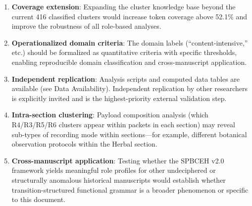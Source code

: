 \documentclass[11pt,a4paper,twocolumn]{article}
\begin{document}
\begin{enumerate}[leftmargin=*,itemsep=2pt]

    \item \textbf{Coverage extension}: Expanding the cluster knowledge base beyond the current 416 classified clusters would increase token coverage above 52.1\% and improve the robustness of all role-based analyses.

    \item \textbf{Operationalized domain criteria}: The domain labels (``content-intensive,'' etc.) should be formalized as quantitative criteria with specific thresholds, enabling reproducible domain classification and cross-manuscript application.

    \item \textbf{Independent replication}: Analysis scripts and computed data tables are available (see Data Availability). Independent replication by other researchers is explicitly invited and is the highest-priority external validation step.

    \item \textbf{Intra-section clustering}: Payload composition analysis (which R4/R3/R5/R6 clusters appear within packets in each section) may reveal sub-types of recording mode within sections---for example, different botanical observation protocols within the Herbal section.

    \item \textbf{Cross-manuscript application}: Testing whether the SPBCEH v2.0 framework yields meaningful role profiles for other undeciphered or structurally anomalous historical manuscripts would establish whether transition-structured functional grammar is a broader phenomenon or specific to this document.


\end{enumerate}
\end{document}
